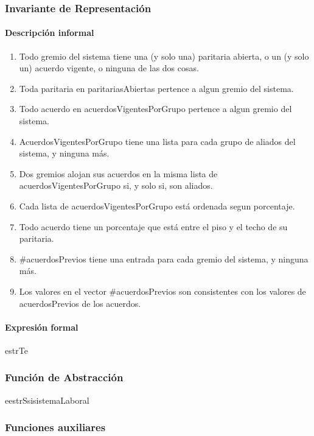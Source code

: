 \subsubsection{Invariante de Representaci\'on}

\paragraph{Descripción informal \\}
\begin{enumerate}

	\item Todo gremio del sistema tiene una (y solo una) paritaria abierta, o un (y solo un) acuerdo vigente, o ninguna de las dos cosas.
	\item Toda paritaria en paritariasAbiertas pertence a algun gremio del sistema.
	\item Todo acuerdo en acuerdosVigentesPorGrupo pertence a algun gremio del sistema.
	\item AcuerdosVigentesPorGrupo tiene una lista para cada grupo de aliados del sistema, y ninguna más.
	\item Dos gremios alojan sus acuerdos en la misma lista de acuerdosVigentesPorGrupo si, y solo si, son aliados.
	\item Cada lista de acuerdosVigentesPorGrupo está ordenada segun porcentaje.
	\item Todo acuerdo tiene un porcentaje que está entre el piso y el techo de su paritaria.
	\item \#acuerdosPrevios tiene una entrada para cada gremio del sistema, y ninguna más.
	\item Los valores en el vector \#acuerdosPrevios son consistentes con los valores de acuerdosPrevios de los acuerdos.

\end{enumerate}

\paragraph{Expresión formal \\}
\begin{RepFormal}{estrT}{e}
\end{RepFormal}

\subsubsection{Funci\'on de Abstracci\'on}

\begin{FunAbsDescriptiva}{e}{estrS}{si}{sistemaLaboral}


\end{FunAbsDescriptiva}

\subsubsection{Funciones auxiliares}
